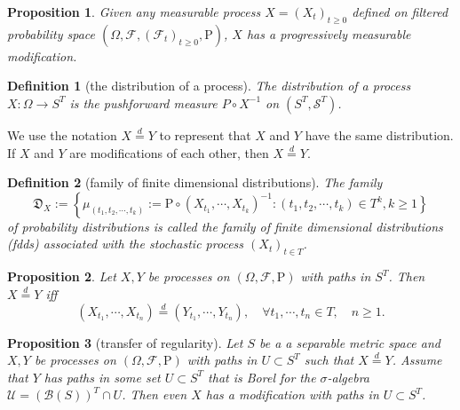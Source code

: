 \documentclass{report}
\newtheorem{definition}{Definition}[section]
\newtheorem{proposition}{Proposition}[section]
\theoremstyle{nonumberplain}
\begin{document}
\begin{proposition}
	Given any measurable process $X=(X_t)_{t\ge0}$ defined on filtered probability space $(\Omega,\mathcal{F},(\mathcal{F}_{t})_{t\ge0},\mathrm{P})$, $X$ has a progressively measurable modification.
\end{proposition}



\begin{definition}[the distribution of a process]
	The distribution of a process $X: \Omega \rightarrow S^T$ is the pushforward measure $P\circ X^{-1}$ on $(S^T,\mathcal{S}^T)$.
\end{definition}
We use the notation $X \stackrel{d}{=} Y$ to represent that $X$ and $Y$ have the same distribution. If $X$ and $Y$ are modifications of each other, then $X \stackrel{d}{=} Y$.

\begin{definition}[family of finite dimensional distributions]
	The family 
	$$\mathfrak{D}_X:=\left\{\mu_{(t_{1}, t_{2}, \cdots, t_{k})}:= \mathrm{P}\circ\left(X_{t_{1}}, \cdots, X_{t_{k}}\right)^{-1}:\right.\left.\left(t_{1}, t_{2}, \cdots, t_{k}\right) \in T^k,k\ge1\right\}$$ of probability distributions is called	the \emph{family of finite dimensional distributions (fdds) associated with the stochastic process $(X_{t})_{t\in T}$}.
\end{definition}

\begin{proposition}
	Let $X,Y$ be processes on $(\Omega ,{\mathcal{F}},\mathrm{P})$ with paths in $S^T$. Then $X \stackrel{d}{=} Y$ iff
	\[
	\left(X_{t_{1}}, \cdots, X_{t_{n}}\right) \stackrel{d}{=}\left(Y_{t_{1}}, \cdots, Y_{t_{n}}\right), \quad \forall t_{1}, \cdots, t_{n} \in T,\quad n\ge 1.
	\]
\end{proposition}



\begin{proposition}[transfer of regularity]
		Let $S$ be a a separable metric space and $X, Y$ be processes on $(\Omega ,{\mathcal{F}},\mathrm{P})$ with paths in $U \subset S^T$ such that $X \stackrel{d}{=} Y$. Assume that $Y$ has paths in some set $U \subset S^{T}$ that is Borel for the $\sigma$-algebra $\mathcal{U}=(\mathcal{B}(S))^{T}\cap U$. Then even $X$ has a modification with paths in $U \subset S^{T}$.
\end{proposition}
\end{document}
